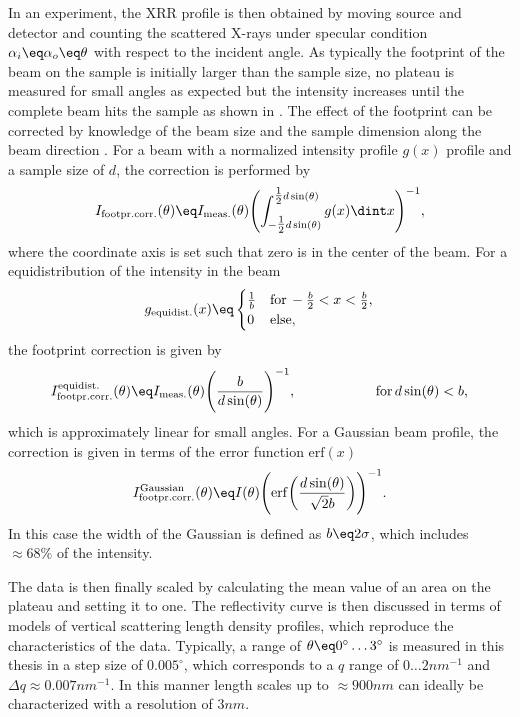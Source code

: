 \documentclass[\main/dresen_thesis.tex]{subfiles}
\begin{document}
    In an experiment, the XRR profile is then obtained by moving source and detector and counting the scattered X-rays under specular condition $\alpha_i \eq \alpha_o \eq \theta$ with respect to the incident angle.
    As typically the footprint of the beam on the sample is initially larger than the sample size, no plateau is measured for small angles as expected but the intensity increases until the complete beam hits the sample as shown in .
    The effect of the footprint can be corrected by knowledge of the beam size and the sample dimension along the beam direction \cite{Gibaud_1993_Theco}.
    For a beam with a normalized intensity profile $g(x)$ profile and a sample size of $d$, the correction is performed by
    \begin{align}
      I_\mathrm{footpr. corr.}(\theta) \eq I_\mathrm{meas.}(\theta) \Biggl( \int_{-\tfrac{1}{2}d \sin(\theta)}^{\tfrac{1}{2}d \sin(\theta)} g(x) \dint x \Biggr)^{-1},
    \end{align}
    where the coordinate axis is set such that zero is in the center of the beam.
    For a equidistribution of the intensity in the beam
    \begin{align}
      g_\mathrm{equidist.}(x) \eq \begin{cases}
        \frac{1}{b}& \mathrm{for\,}-\frac{b}{2} < x < \frac{b}{2},\\
        0&\mathrm{else},
      \end{cases}
    \end{align}
    the footprint correction is given by
    \begin{align}
      I_\mathrm{footpr. corr.}^\mathrm{equidist.}(\theta) \eq I_\mathrm{meas.}(\theta) \Biggl( \frac{b}{d \sin(\theta)}\Biggr)^{-1},\hspace{2cm}\mathrm{for\,}d\sin(\theta)<b ,
    \end{align}
    which is approximately linear for small angles.
    For a Gaussian beam profile, the correction is given in terms of the error function $\mathrm{erf}(x)$
    \begin{align}
      I_\mathrm{footpr. corr.}^\mathrm{Gaussian}(\theta) \eq I(\theta) \Biggl( \mathrm{erf}\biggl( \frac{d \sin(\theta)}{\sqrt{2}b} \biggr) \Biggr)^{-1}.
    \end{align}
    In this case the width of the Gaussian is defined as $b \eq 2 \sigma$, which includes $\approx 68 \%$ of the intensity.

    The data is then finally scaled by calculating the mean value of an area on the plateau and setting it to one.
    The reflectivity curve is then discussed in terms of models of vertical scattering length density profiles, which reproduce the characteristics of the data.
    Typically, a range of $\theta \eq 0^\circ \ldots 3^\circ$ is measured in this thesis in a step size of $0.005^\circ$, which corresponds to a $q$ range of $0 \ldots 2 \unit{nm^{-1}}$ and $\Delta q \approx 0.007 \unit{nm^{-1}}$.
    In this manner length scales up to $\approx 900 \unit{nm}$ can ideally be characterized with a resolution of $3 \unit{nm}$.
\end{document}
